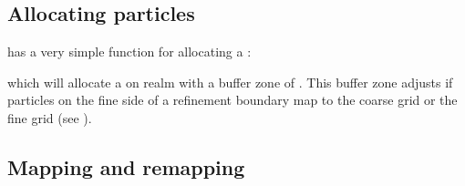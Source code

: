 \documentclass[letterpaper,10pt,english]{sphinxmanual}
\begin{document}
\subsection{Allocating particles}
\label{\detokenize{Source/Particles:allocating-particles}}
 has a very simple function for allocating a :

\begin{sphinxVerbatim}[commandchars=\\\{\},formatcom=\scriptsize]
  
        
\end{sphinxVerbatim}

which will allocate a  on realm  with a buffer zone of .
This buffer zone adjusts if particles on the fine side of a refinement boundary map to the coarse grid or the fine grid (see {\hyperref[\detokenize{Source/Particles:chap-particlemapping}]{}}).


\subsection{Mapping and remapping}
\label{\detokenize{Source/Particles:mapping-and-remapping}}\label{\detokenize{Source/Particles:chap-particlemapping}}
\end{document}
